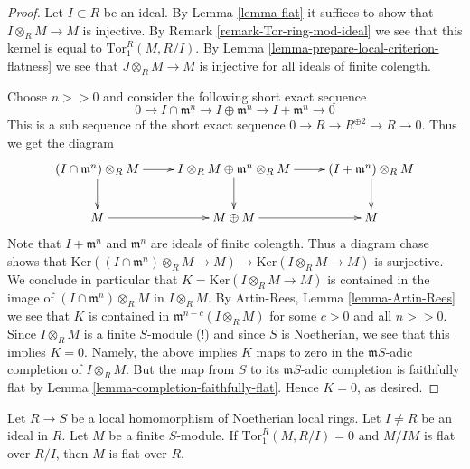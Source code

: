 \begin{proof}
Let $I \subset R$ be an ideal. By Lemma \ref{lemma-flat} it suffices
to show that $I \otimes_R M \to M$ is injective. By Remark
\ref{remark-Tor-ring-mod-ideal} we see that this kernel is
equal to $\text{Tor}_1^R(M, R/I)$. By
Lemma \ref{lemma-prepare-local-criterion-flatness}
we see that $J \otimes_R M \to M$ is injective for all ideals
of finite colength.

\medskip\noindent
Choose $n >> 0$ and consider the following short exact 
sequence
$$
0
\to I \cap \mathfrak m^n
\to I \oplus \mathfrak m^n
\to I + \mathfrak m^n
\to 0
$$
This is a sub sequence of the short exact sequence
$0 \to R \to R^{\oplus 2} \to R \to 0$. Thus we get the diagram
$$
\xymatrix{
(I\cap \mathfrak m^n) \otimes_R M \ar[r] \ar[d] &
I \otimes_R M \oplus \mathfrak m^n \otimes_R M \ar[r] \ar[d] &
(I + \mathfrak m^n) \otimes_R M \ar[d] \cr
M \ar[r] & 
M \oplus M \ar[r] &
M
}
$$
Note that $I + \mathfrak m^n$ and $\mathfrak m^n$
are ideals of finite colength.
Thus a diagram chase shows that
$\text{Ker}((I \cap \mathfrak m^n)\otimes_R M \to M)
\to \text{Ker}(I\otimes_R M \to M)$
is surjective. We conclude in particular that
$K = \text{Ker}(I\otimes_R M \to M)$ is contained
in the image of $(I \cap \mathfrak m^n) \otimes_R M$
in $I \otimes_R M$. By Artin-Rees, Lemma \ref{lemma-Artin-Rees}
we see that $K$ is contained
in $\mathfrak m^{n-c}(I \otimes_R M)$ for some $c > 0$
and all $n >> 0$. Since $I \otimes_R M$ is a finite
$S$-module (!) and since $S$ is Noetherian, we see
that this implies $K = 0$. Namely, the above implies
$K$ maps to zero in the $\mathfrak mS$-adic completion
of $I\otimes_R M$. But the map from $S$
to its $\mathfrak mS$-adic completion is faithfully flat
by Lemma \ref{lemma-completion-faithfully-flat}.
Hence $K = 0$, as desired.
\end{proof}

\begin{lemma}
\label{lemma-variant-local-criterion-flatness}
Let $R \to S$ be a local homomorphism of Noetherian
local rings. Let $I \not = R$ be an ideal in $R$.
Let $M$ be a finite $S$-module. If $\text{Tor}_1^R(M, R/I) = 0$
and $M/IM$ is flat over $R/I$, then $M$ is flat over $R$.
\end{lemma}

